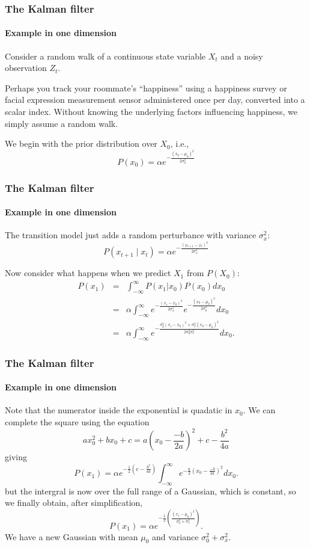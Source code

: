 \documentclass[aspectratio=169]{beamer}
\begin{document}
\begin{frame}
\frametitle{The Kalman filter}
\framesubtitle{Example in one dimension}

Consider a \alert{random walk} of a continuous state variable $X_t$
and a noisy observation $Z_t$.

\medskip
Perhaps you track your roommate's ``happiness'' using a happiness
survey or facial expression
measurement sensor administered once per day,
converted into a scalar index.
Without knowing the underlying factors influencing happiness, we
simply assume a random walk.

\medskip
We begin with the \alert{prior} distribution over $X_0$, i.e.,
\[ P(x_0) = \alpha e^{ - \frac{(x_0-\mu_0)^2}{2 \sigma_0^2}
  } \]

\end{frame}

\begin{frame}
\frametitle{The Kalman filter}
\framesubtitle{Example in one dimension}

The transition model just adds a random perturbance with variance
$\sigma_x^2$:
\[ P(x_{t+1} \mid x_t) = \alpha e^{ - \frac{(x_{t+1}-x_t)^2}{2\sigma_x^2} } \]

\medskip

Now consider what happens when we predict $X_1$ from $P(X_0)$:
\begin{eqnarray*}
P(x_1) & = & \int_{-\infty}^{\infty} P(x_1|x_0) P(x_0) dx_0 \\
       & = & \alpha \int_{-\infty}^{\infty} e^{-
               \frac{(x_1-x_0)^2}{2\sigma_x^2} }
             e^{-\frac{(x_0-\mu_0)^2}{2\sigma_0^2} } dx_0 \\
       & = & \alpha \int_{-\infty}^{\infty} e^{-
         \frac{\sigma_0^2(x_1-x_0)^2 +
         \sigma_x^2(x_0-\mu_0)^2}{2\sigma_0^2\sigma_x^2}} dx_0 .
\end{eqnarray*}
\end{frame}

\begin{frame}
\frametitle{The Kalman filter}
\framesubtitle{Example in one dimension}

Note that the numerator inside the exponential is quadatic in $x_0$.
We can complete the square using the equation
\[ ax_0^2 + bx_0 + c = a \left( x_0 - \frac{-b}{2a} \right)^2 +
  c - \frac{b^2}{4a} \]
giving
\[ P(x_1) = \alpha e^{ -\frac{1}{2} \left( c - \frac{b^2}{4a}
         \right)} \int_{-\infty}^{\infty} e^{ - \frac{a}{2}
         \left( x_0 - \frac{-b}{2a}\right)^2} dx_0 .
\]
but the intergral is now over the full range of a Gaussian, which is
constant, so we finally obtain, after simplification,
\[ P(x_1) = \alpha e^{ -\frac{1}{2} \left(
         \frac{(x_1-\mu_0)^2}{\sigma_0^2 + \sigma_x^2} \right)}. \] We
have a new Gaussian with mean $\mu_0$ and variance
$\sigma_0^2+\sigma_x^2$.

\end{frame}
\end{document}
